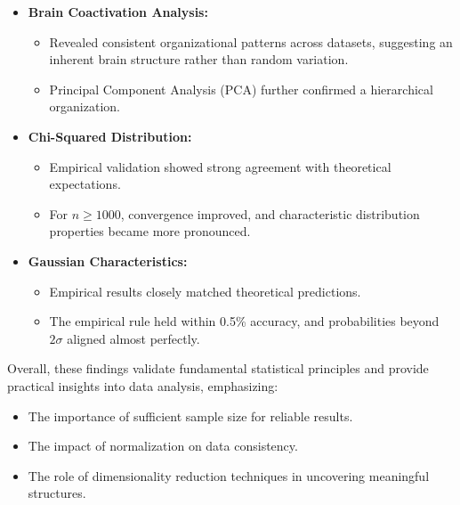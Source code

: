 \documentclass[12pt]{article}
\begin{document}
\begin{itemize}
    \item \textbf{Brain Coactivation Analysis:}  
    \begin{itemize}
        \item Revealed consistent organizational patterns across datasets, suggesting an inherent brain structure rather than random variation.  
        \item Principal Component Analysis (PCA) further confirmed a hierarchical organization.  
    \end{itemize}

    \item \textbf{Chi-Squared Distribution:}  
    \begin{itemize}
        \item Empirical validation showed strong agreement with theoretical expectations.  
        \item For $n \geq 1000$, convergence improved, and characteristic distribution properties became more pronounced.  
    \end{itemize}

    \item \textbf{Gaussian Characteristics:}  
    \begin{itemize}
        \item Empirical results closely matched theoretical predictions.  
        \item The empirical rule held within 0.5\% accuracy, and probabilities beyond $2\sigma$ aligned almost perfectly.  
    \end{itemize}
\end{itemize}

Overall, these findings validate fundamental statistical principles and provide practical insights into data analysis, emphasizing:
\begin{itemize}
    \item The importance of sufficient sample size for reliable results.  
    \item The impact of normalization on data consistency.  
    \item The role of dimensionality reduction techniques in uncovering meaningful structures.  
\end{itemize}
\end{document}
